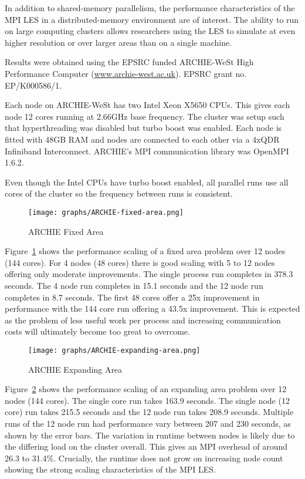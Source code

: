 In addition to shared-memory parallelism, the performance characteristics of the
MPI LES in a distributed-memory environment are of interest. The ability to run
on large computing clusters allows researchers using the LES to simulate at even
higher resolution or over larger areas than on a single machine.

Results were obtained using the EPSRC funded ARCHIE-WeSt High Performance
Computer (\url{www.archie-west.ac.uk}). EPSRC grant no. EP/K000586/1.

Each node on ARCHIE-WeSt has two Intel Xeon X5650 CPUs. This gives each node 12
cores running at 2.66GHz base frequency. The cluster was setup such that
hyperthreading was disabled but turbo boost was enabled. Each node is fitted
with 48GB RAM and nodes are connected to each other via a 4xQDR Infiniband
Interconnect. ARCHIE's MPI communication library was OpenMPI 1.6.2.

Even though the Intel CPUs have turbo boost enabled, all parallel runs use all
cores of the cluster so the frequency between runs is consistent.

\begin{figure}
    \texttt{[image: graphs/ARCHIE-fixed-area.png]}
    \caption{ARCHIE Fixed Area}
    \label{fig:archiefixedarea}
\end{figure}

Figure~\ref{fig:archiefixedarea} shows the performance scaling of a fixed area
problem over 12 nodes (144 cores). For 4 nodes (48 cores) there is good scaling
with 5 to 12 nodes offering only moderate improvements. The single process run
completes in 378.3 seconds. The 4 node run completes in 15.1 seconds and the 12
node run completes in 8.7 seconds. The first 48 cores offer a 25x improvement in
performance with the 144 core run offering a 43.5x improvement. This is expected
as the problem of less useful work per process and increasing communication
costs will ultimately become too great to overcome.

\begin{figure}
    \texttt{[image: graphs/ARCHIE-expanding-area.png]}
    \caption{ARCHIE Expanding Area}
    \label{fig:archieexpandingarea}
\end{figure}

Figure~\ref{fig:archieexpandingarea} shows the performance scaling of an
expanding area problem over 12 nodes (144 cores). The single core run takes
163.9 seconds. The single node (12 core) run takes 215.5 seconds and the 12 node
run takes 208.9 seconds. Multiple runs of the 12 node run had performance vary
between 207 and 230 seconds, as shown by the error bars. The variation in
runtime between nodes is likely due to the differing load on the cluster
overall. This gives an MPI overhead of around 26.3 to 31.4\%. Crucially, the
runtime does not grow on increasing node count showing the strong scaling
characteristics of the MPI LES.

